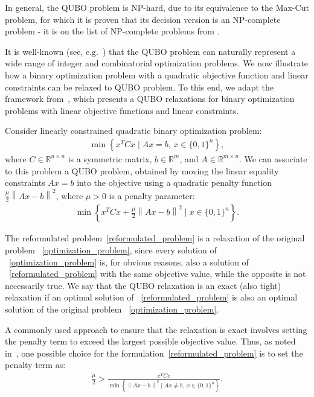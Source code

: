 \documentclass{article}
\begin{document}
In general, the QUBO problem is NP-hard, due to its equivalence to the Max-Cut problem, for which it is proven that its decision version is an NP-complete problem - it is on the list of NP-complete problems from   \cite{garey1979computers}.

It is well-known (see, e.g.~\cite{Papadimitriou1982}) that the QUBO problem  can naturally represent a wide range of integer and combinatorial optimization problems. We now illustrate how a binary optimization problem with a quadratic objective function and linear constraints can be relaxed to QUBO problem. To this end, we adapt the framework from~\cite{Quintero2020}, which presents a QUBO relaxations for binary optimization problems with linear objective functions and linear constraints.

Consider linearly constrained quadratic binary  optimization problem:
\begin{align}\label{optimization_problem}
\min \left\{ x^T C x \mid Ax = b, \, x \in \{0, 1\}^n \right\},
\end{align}
where $C \in \mathbb{R}^{n \times n}$ is a symmetric matrix, $b \in \mathbb{R}^m$, and $A \in \mathbb{R}^{m \times n}$. We can associate to  this problem  a QUBO problem, obtained by moving the linear equality constraints $Ax = b$  into the objective using a quadratic penalty function $\frac{\mu}{2} \left \| Ax - b \right \|^2$, where $\mu > 0$ is a penalty parameter:
\begin{align}\label{reformulated_problem}
\min \left\{ x^T C x + \frac{\mu}{2} \left \| Ax - b \right \|^2 \mid x \in \{0, 1\}^n \right\}.
\end{align}

 The reformulated problem~\eqref{reformulated_problem} is a relaxation of the original problem ~\eqref{optimization_problem}, since every solution of  ~\eqref{optimization_problem} is, for obvious reasons, also a solution of ~\eqref{reformulated_problem} with the same objective value, while the opposite is not necessarily true. We say that the QUBO relaxation is an exact (also tight) relaxation if an optimal solution of ~\eqref{reformulated_problem} is also an optimal solution of the original problem ~\eqref{optimization_problem}.

A commonly used approach to ensure that the relaxation is exact involves setting the penalty term to exceed the largest possible objective value. Thus, as noted in~\cite{Quintero2020}, one possible choice for the formulation~\eqref{reformulated_problem} is to set the penalty term as:
\begin{align}\label{penalty_exact_method}
\frac{\mu}{2} > \frac{e^T C e}{\min \left\{ \left \| Ax - b \right \|^2 \mid Ax \neq b, ~x \in \{0, 1\}^n \right\}}.
\end{align}
\end{document}
